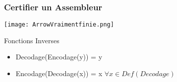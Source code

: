 \documentclass{beamer}
\begin{document}
\begin{frame}
\frametitle{Certifier un Assembleur}

\texttt{[image: ArrowVraimentfinie.png]}

\begin{block}{Fonctions Inverses}
\begin{itemize}
\item Decodage(Encodage(y)) = y
\item Encodage(Decodage(x)) = x  \hspace{2cm} $\forall x \in Def(Decodage)$
\end{itemize}  
\end{block}

\end{frame}
\end{document}
